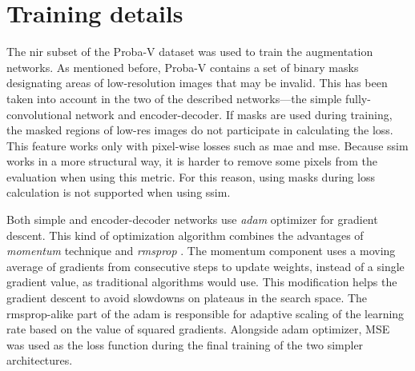 \section{Training details}
The \gls{nir} subset of the Proba-V dataset was used to train the augmentation networks.
As mentioned before, Proba-V contains a set of binary masks designating areas of low-resolution images that may be invalid.
This has been taken into account in the two of the described networks---the simple fully-convolutional network and encoder-decoder.
If masks are used during training, the masked regions of low-res images do not participate in calculating the loss.
This feature works only with pixel-wise losses such as \gls{mae} and \gls{mse}.
Because \gls{ssim} works in a more structural way, it is harder to remove some pixels from the evaluation when using this metric.
For this reason, using masks during loss calculation is not supported when using \gls{ssim}.

Both simple and encoder-decoder networks use \textit{\gls{adam}} \cite{kingma-2014-adam} optimizer for gradient descent.
This kind of optimization algorithm combines the advantages of \textit{momentum} technique and \textit{\gls{rmsprop}} \cite{sun-2019-optimization}.
The momentum component uses a moving average of gradients from consecutive steps to update weights, instead of a single gradient value, as traditional algorithms would use.
This modification helps the gradient descent to avoid slowdowns on plateaus in the search space.
The \gls{rmsprop}-alike part of the \gls{adam} is responsible for adaptive scaling of the learning rate based on the value of squared gradients.
Alongside \gls{adam} optimizer, MSE was used as the loss function during the final training of the two simpler architectures.

